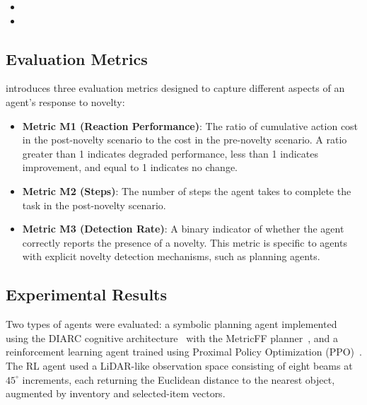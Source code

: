 \begin{itemize}[leftmargin=*]
    \item {}

    \item {}
\end{itemize}


\subsection{Evaluation Metrics}
\label{sec:ngw_metrics}

\NovelGridworlds{} introduces three evaluation metrics designed to capture different aspects of an agent's response to novelty:
\begin{itemize}[leftmargin=*]
    \item \textbf{Metric M1 (Reaction Performance)}: The ratio of cumulative action cost in the post-novelty scenario to the cost in the pre-novelty scenario. A ratio greater than 1 indicates degraded performance, less than 1 indicates improvement, and equal to 1 indicates no change.
    \item \textbf{Metric M2 (Steps)}: The number of steps the agent takes to complete the task in the post-novelty scenario.
    \item \textbf{Metric M3 (Detection Rate)}: A binary indicator of whether the agent correctly reports the presence of a novelty. This metric is specific to agents with explicit novelty detection mechanisms, such as planning agents.
\end{itemize}


\subsection{Experimental Results}
\label{sec:ngw_results}

Two types of agents were evaluated: a symbolic planning agent implemented using the DIARC cognitive architecture~\citep{schermerhorn2006diarc, scheutz2019diarc} with the MetricFF planner~\citep{hoffmann2003metricff}, and a reinforcement learning agent trained using Proximal Policy Optimization (PPO)~\citep{schulman2017proximal}. The RL agent used a LiDAR-like observation space consisting of eight beams at $45^\circ$ increments, each returning the Euclidean distance to the nearest object, augmented by inventory and selected-item vectors.

